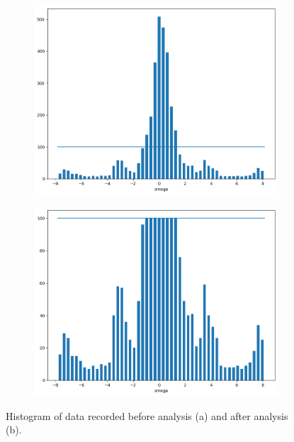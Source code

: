 \documentclass[conference]{IEEEtran}
\begin{document}
\begin{figure}[h]
	\begin{subfigure}{.475\columnwidth}
    	\centering
    	\includegraphics[width=1\columnwidth]{h1}
    	\caption{}
    	\label{fig:cnn-data-hist1}
    \end{subfigure}
    \begin{subfigure}{.475\columnwidth}
    	\centering
    	\includegraphics[width=1\columnwidth]{h2}
    	\caption{}
    	\label{fig:cnn-data-hist2}
    \end{subfigure}
    
    \caption{Histogram of data recorded before analysis (a) and after analysis (b).}
    \label{fig:cnn-data-hist}
\end{figure}
\end{document}
